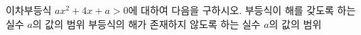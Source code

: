 이차부등식 $ax^2+4x+a>0$에 대하여 다음을 구하시오.
 부등식이 해를 갖도록 하는 실수 $a$의 값의 범위
 부등식의 해가 존재하지 않도록 하는 실수 $a$의 값의 범위
